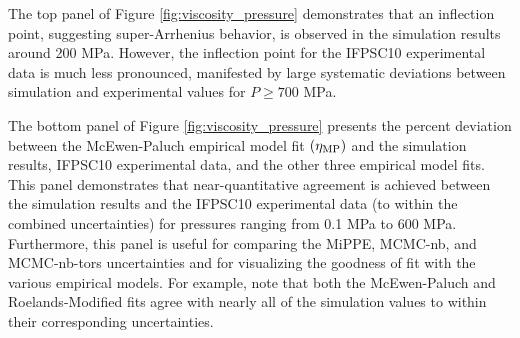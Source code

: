 \documentclass[preprint,review,12pt]{elsarticle}
\begin{document}
    The top panel of Figure \ref{fig:viscosity_pressure} demonstrates that an inflection point, suggesting super-Arrhenius behavior, is observed in the simulation results around 200 MPa. However, the inflection point for the IFPSC10 experimental data is much less pronounced, manifested by large systematic deviations between simulation and experimental values for $P \ge 700$ MPa. 
	
	The bottom panel of Figure \ref{fig:viscosity_pressure} presents the percent deviation between the McEwen-Paluch empirical model fit $(\eta_{\rm MP})$ and the simulation results, IFPSC10 experimental data, and the other three empirical model fits. This panel demonstrates that near-quantitative agreement is achieved between the simulation results and the IFPSC10 experimental data (to within the combined uncertainties) for pressures ranging from 0.1 MPa to 600 MPa. Furthermore, this panel is useful for comparing the MiPPE, MCMC-nb, and MCMC-nb-tors uncertainties and for visualizing the goodness of fit with the various empirical models. For example, note that both the McEwen-Paluch and Roelands-Modified fits agree with nearly all of the simulation values to within their corresponding uncertainties.  
	
	\clearpage
	\newpage
	
\end{document}
